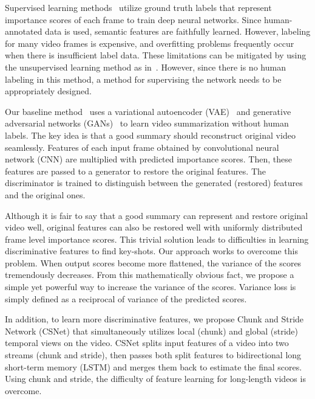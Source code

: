 \documentclass[letterpaper]{article} \usepackage{aaai19}  \usepackage{times}  \usepackage{helvet}  \usepackage{courier}  \usepackage{url}  \usepackage{graphicx}  \frenchspacing  \setlength{\pdfpagewidth}{8.5in}  \setlength{\pdfpageheight}{11in}
\begin{document}
Supervised learning methods~\cite{zhang2016summary,zhang2016video,zhao2017hierarchical,zhao2018hsa,wei2018video} utilize ground truth labels that represent importance scores of each frame to train deep neural networks. Since human-annotated data is used, semantic features are faithfully learned. However, labeling for many video frames is expensive, and overfitting problems frequently occur when there is insufficient label data. These limitations can be mitigated by using the unsupervised learning method as in~\cite{Mahasseni2017VAEGAN,zhou2017deep}. However, since there is no human labeling in this method, a method for supervising the network needs to be appropriately designed.

Our baseline method~\cite{Mahasseni2017VAEGAN} uses a variational autoencoder (VAE)~\cite{kingma2013auto} and generative adversarial networks (GANs)~\cite{goodfellow2014generative} to learn video summarization without human labels. The key idea is that a good summary should reconstruct original video seamlessly. Features of each input frame obtained by convolutional neural network (CNN) are multiplied with predicted importance scores. Then, these features are passed to a generator to restore the original features. The discriminator is trained to distinguish between the generated (restored) features and the original ones.








Although it is fair to say that a good summary can represent and restore original video well, original features can also be restored well with uniformly distributed frame level importance scores. This trivial solution leads to difficulties in learning discriminative features to find key-shots. Our approach works to overcome this problem. When output scores become more flattened, the variance of the scores tremendously decreases. From this mathematically obvious fact, we propose a simple yet powerful way to increase the variance of the scores. Variance loss is simply defined as a reciprocal of variance of the predicted scores. 

In addition, to learn more discriminative features, we propose Chunk and Stride Network (CSNet) that simultaneously utilizes local (chunk) and global (stride) temporal views on the video. CSNet splits input features of a video into two streams (chunk and stride), then passes both split features to bidirectional long short-term memory (LSTM) and merges them back to estimate the final scores. Using chunk and stride, the difficulty of feature learning for long-length videos is overcome.
\end{document}
